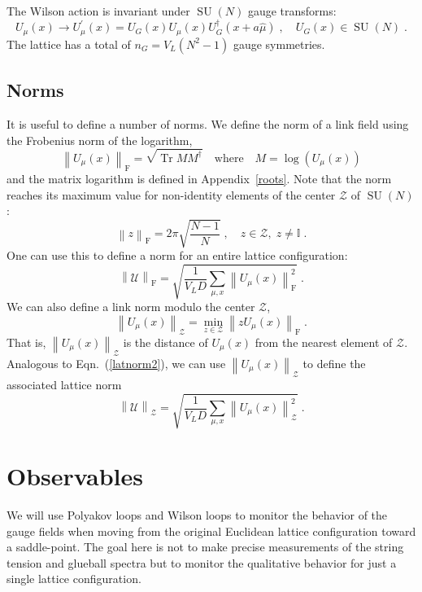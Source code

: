\documentclass[preprint,aps,prd]{revtex4-2}
\newcommand{\da}{\dagger}  %
\newcommand{\be}{\begin{equation}}
\newcommand{\eq}{\end{equation}}
\newcommand{\zentrum}{\mathcal{Z}}       %
\newcommand{\config}{\mathcal{U}}
\DeclareMathOperator{\SU}{SU}
\DeclareMathOperator{\Tr}{Tr}
\newcommand\fnorm[1]{\left\lVert #1 \right\rVert_\mathrm{F}}
\newcommand\znorm[1]{\left\lVert #1 \right\rVert_\zentrum}
\begin{document}
The Wilson action is invariant under $\SU(N)$ gauge transforms:
%
\be
    U_\mu(x) \to U_\mu^\prime(x) = U_G(x) U_\mu(x) U_G^\da(x+a \hat{\mu})
         \; , \quad U_G(x) \in \SU(N) \; . \label{gauget}
\eq
%
The lattice has a total of $n_G = V_L\left(N^2-1\right)$ gauge symmetries.

\subsection{Norms}

It is useful to define a number of norms.  We define the norm
of a link field using the Frobenius norm of the logarithm,
%
\be
   \fnorm{U_\mu(x)} =
   \sqrt{\Tr M M^\dagger} \quad \mbox{where}
   \quad M = \log\left(U_\mu(x)\right)
   \label{sunorm}
\eq
and the matrix logarithm is defined in Appendix~\ref{roots}.
Note that the norm reaches its maximum value for non-identity
elements of the center $\zentrum$ of $\SU(N)$:
\be
    \fnorm{z} = 2\pi \sqrt{\frac{N-1}{N}} \; ,
     \quad z\in \zentrum,\; z\ne\mathbb{I} \; .
\eq
One can use this to define a norm for an entire
lattice configuration:
\be
   \fnorm{\config} =
   \sqrt{\frac{1}{V_L D} \sum_{\mu,x} \fnorm{U_\mu(x)}^2}
   \; . \label{latnorm2}
\eq
%
%
We can also define a link norm modulo the center $\zentrum$,
\be
  \znorm{U_\mu(x)} = \min_{z\in \zentrum} \fnorm{z U_\mu(x)} \; .
\eq
That is, $\znorm{U_\mu(x)}$ is the distance
of $U_\mu(x)$ from the nearest element of $\zentrum$.
Analogous to Eqn.~(\ref{latnorm2}), we can
use $\znorm{U_\mu(x)}$ to define the associated lattice norm
\be
    \znorm{\config} = \sqrt{\frac{1}{V_L D} \sum_{\mu,x}
  \znorm{U_\mu(x)}^2}
   \; . \label{latnormz}
\eq

\section{Observables}
\label{observables}

We will use Polyakov loops and Wilson loops to monitor the
behavior of the gauge fields when moving from
the original Euclidean lattice configuration toward
a saddle-point.  The goal here is not to make precise
measurements of the string tension and glueball spectra
but to monitor the qualitative behavior for just a single
lattice configuration.
\end{document}
